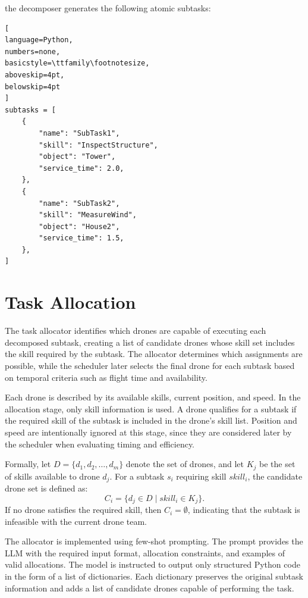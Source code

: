 the decomposer generates the following atomic subtasks:

\noindent\begin{minipage}{\linewidth}
\begin{lstlisting}[
language=Python,
numbers=none,
basicstyle=\ttfamily\footnotesize,
aboveskip=4pt,
belowskip=4pt
]
subtasks = [
    {
        "name": "SubTask1",
        "skill": "InspectStructure",
        "object": "Tower",
        "service_time": 2.0,
    },
    {
        "name": "SubTask2",
        "skill": "MeasureWind",
        "object": "House2",
        "service_time": 1.5,
    },
]
\end{lstlisting}
\end{minipage}

\section{Task Allocation}
The task allocator identifies which drones are capable of executing each decomposed subtask, 
creating a list of candidate drones whose skill set includes the skill required by the subtask.
The allocator determines which assignments are possible, 
while the scheduler later selects the final drone for each subtask based on temporal criteria such as flight time and availability.

Each drone is described by its available skills, current position, and speed.
In the allocation stage, only skill information is used.
A drone qualifies for a subtask if the required skill of the subtask is included in the drone's skill list.
Position and speed are intentionally ignored at this stage, since they are considered later by the scheduler when evaluating timing and efficiency.

Formally, let \(D = \{d_1, d_2, \dots, d_m\}\) denote the set of drones, and let \(K_j\) be the set of skills available to drone \(d_j\).
For a subtask \(s_i\) requiring skill \(skill_i\), the candidate drone set is defined as:
\[
C_i = \{d_j \in D \mid skill_i \in K_j\}.
\]
If no drone satisfies the required skill, then \(C_i = \emptyset\), indicating that the subtask is infeasible with the current drone team.

The allocator is implemented using few-shot prompting.
The prompt provides the LLM with the required input format, allocation constraints, and examples of valid allocations.
The model is instructed to output only structured Python code in the form of a list of dictionaries.
Each dictionary preserves the original subtask information and adds a list of candidate drones capable of performing the task.

